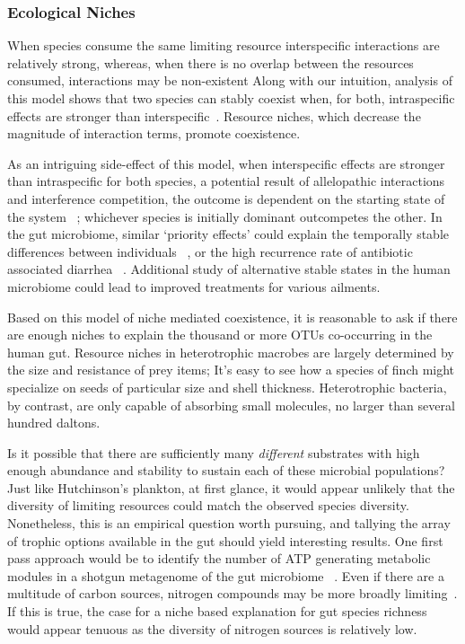 \documentclass[12pt]{article}
\begin{document}
\subsubsection{Ecological Niches}
When species consume the same limiting resource
interspecific interactions are relatively strong,
whereas, when there is no overlap between the resources consumed,
interactions may be non-existent
Along with our intuition, analysis of this model shows that
two species can stably coexist when, for both,
intraspecific effects are stronger than interspecific~\citep{Chesson2000a}.
Resource niches,
which decrease the magnitude of interaction terms,
promote coexistence.

As an intriguing side-effect of this model,
when interspecific effects are stronger than intraspecific for both
species,
a potential result of allelopathic interactions and
interference competition,
the outcome is dependent on the starting state of the system%
~\citep{Amarasekare2002};
whichever species is initially dominant outcompetes the other.
In the gut microbiome, similar `priority effects' could explain the
temporally stable differences between individuals%
~\citep{Dethlefsen2006,Lahti2014},
or the high recurrence rate of antibiotic associated diarrhea%
~\citep{Lemon2012}.
Additional study of alternative stable states in the human
microbiome could lead to improved treatments for various ailments.

Based on this model of niche mediated coexistence,
it is reasonable to ask if there are enough niches
to explain the thousand or more OTUs co-occurring in the human gut.
Resource niches in heterotrophic macrobes are largely
determined by the size and resistance of prey items;
It's easy to see how a species of finch might specialize on
seeds of particular size and shell thickness.
Heterotrophic bacteria, by contrast, are only capable of
absorbing small molecules,
no larger than several hundred daltons.

Is it possible that there are sufficiently many \emph{different}
substrates with high enough abundance and stability
to sustain each of these microbial populations?
Just like Hutchinson's plankton,
at first glance, it would appear unlikely that the diversity
of limiting resources could match the observed species
diversity.
Nonetheless, this is an empirical question worth pursuing,
and tallying the array of trophic options available in the gut
should yield interesting results.
One first pass approach would be to identify the number of
ATP generating metabolic modules in a shotgun metagenome of the gut microbiome%
~\citep{Lemon2012}.
Even if there are a multitude of carbon sources,
nitrogen compounds may be more broadly limiting~\citep{Faith2011}.
If this is true, the case for a niche based explanation for
gut species richness would appear tenuous
as the diversity of nitrogen sources is relatively low.
\end{document}
